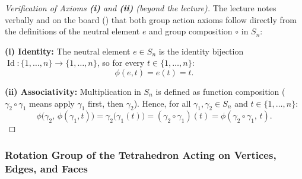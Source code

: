 \begin{content}

\begin{proof}[Verification of Axioms \textbf{(i)} and \textbf{(ii)} (beyond the lecture)]
The lecture notes verbally and on the board () that both group action axioms follow directly from the definitions of the neutral element $e$ and group composition $\circ$ in $S_n$:

\textbf{(i) Identity:} The neutral element $e \in S_n$ is the identity bijection $\operatorname{Id} \colon \{1, \dots, n\} \to \{1, \dots, n\}$, so for every $t \in \{1, \dots, n\}$:
\[
\phi(e, t) = e(t) = t.
\]

\textbf{(ii) Associativity:} Multiplication in $S_n$ is defined as function composition ($\gamma_2 \circ \gamma_1$ means apply $\gamma_1$ first, then $\gamma_2$). Hence, for all $\gamma_1, \gamma_2 \in S_n$ and $t \in \{1, \dots, n\}$:
\[
\phi\bigl(\gamma_2,\, \phi(\gamma_1, t)\bigr) = \gamma_2\bigl(\gamma_1(t)\bigr) = (\gamma_2 \circ \gamma_1)(t) = \phi(\gamma_2 \circ \gamma_1,\, t).
\]
\end{proof}
\end{content}

\begin{hidden}
\end{hidden}

\subsubsection{Rotation Group of the Tetrahedron Acting on Vertices, Edges, and Faces}


